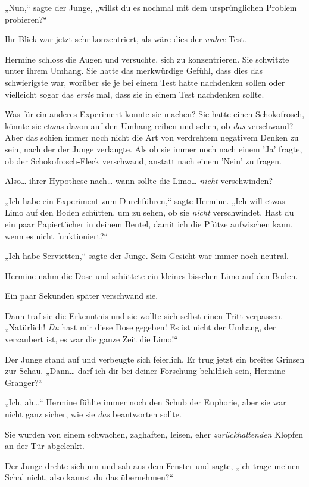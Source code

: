 {„Nun,“ sagte der Junge, „willst du es nochmal mit dem ursprünglichen Problem probieren?“

Ihr Blick war jetzt sehr konzentriert, als wäre dies der \emph{wahre} Test.

Hermine schloss die Augen und versuchte, sich zu konzentrieren. Sie schwitzte unter ihrem Umhang. Sie hatte das merkwürdige Gefühl, dass dies das schwierigste war, worüber sie je bei einem Test hatte nachdenken sollen oder vielleicht sogar das \emph{erste} mal, dass sie in einem Test nachdenken sollte.

Was für ein anderes Experiment konnte sie machen? Sie hatte einen Schokofrosch, könnte sie etwas davon auf den Umhang reiben und sehen, ob \emph{das} verschwand? Aber das schien immer noch nicht die Art von verdrehtem negativem Denken zu sein, nach der der Junge verlangte. Als ob sie immer noch nach einem 'Ja' fragte, ob der Schokofrosch-Fleck verschwand, anstatt nach einem 'Nein' zu fragen.

Also… ihrer Hypothese nach… wann sollte die Limo… \emph{nicht} verschwinden?

„Ich habe ein Experiment zum Durchführen,“ sagte Hermine. „Ich will etwas Limo auf den Boden schütten, um zu sehen, ob sie \emph{nicht} verschwindet. Hast du ein paar Papiertücher in deinem Beutel, damit ich die Pfütze aufwischen kann, wenn es nicht funktioniert?“

„Ich habe Servietten,“ sagte der Junge. Sein Gesicht war immer noch neutral.

Hermine nahm die Dose und schüttete ein kleines bisschen Limo auf den Boden.

Ein paar Sekunden später verschwand sie.

Dann traf sie die Erkenntnis und sie wollte sich selbst einen Tritt verpassen. „Natürlich! \emph{Du} hast mir diese Dose gegeben! Es ist nicht der Umhang, der verzaubert ist, es war die ganze Zeit die Limo!“

Der Junge stand auf und verbeugte sich feierlich. Er trug jetzt ein breites Grinsen zur Schau. „Dann… darf ich dir bei deiner Forschung behilflich sein, Hermine Granger?“

„Ich, ah…“ Hermine fühlte immer noch den Schub der Euphorie, aber sie war nicht ganz sicher, wie sie \emph{das} beantworten sollte.

Sie wurden von einem schwachen, zaghaften, leisen, eher \emph{zurückhaltenden} Klopfen an der Tür abgelenkt.

Der Junge drehte sich um und sah aus dem Fenster und sagte, „ich trage meinen Schal nicht, also kannst du das übernehmen?“

}
